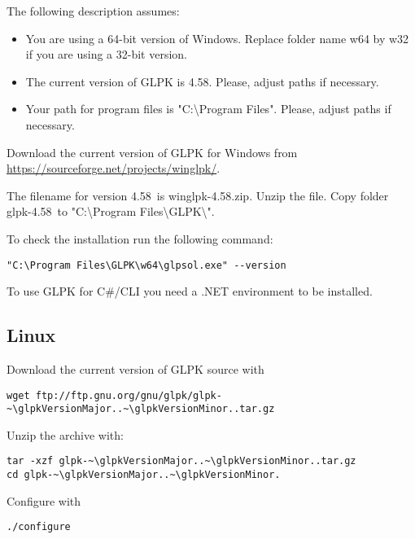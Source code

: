 \documentclass[a4paper,11pt]{report}
\newcommand{\glpkVersionMajor}{4}
\newcommand{\glpkVersionMinor}{58}
\begin{document}
The following description assumes:

\begin{itemize}
\item You are using a 64-bit version of Windows. Replace folder name w64 by w32
if you are using a 32-bit version.
\item The current version of GLPK is \glpkVersionMajor.\glpkVersionMinor.
Please, adjust paths if necessary.
\item Your path for program files is "C:\textbackslash Program Files". Please,
adjust paths if necessary.
\end{itemize}

Download the current version of GLPK for Windows from
\href{https://sourceforge.net/projects/winglpk/}{https://sourceforge.net/projects/winglpk/}.

The filename for version \glpkVersionMajor.\glpkVersionMinor\ is
winglpk-\glpkVersionMajor.\glpkVersionMinor.zip. Unzip the file. Copy folder
glpk-\glpkVersionMajor.\glpkVersionMinor\ to "C:\textbackslash Program
Files\textbackslash GLPK\textbackslash ".

To check the installation run the following command:

\begin{lstlisting}
"C:\Program Files\GLPK\w64\glpsol.exe" --version
\end{lstlisting}

To use GLPK for C\#/CLI you need a .NET environment to be installed.

\subsection{Linux}

Download the current version of GLPK source with

\begin{lstlisting}
wget ftp://ftp.gnu.org/gnu/glpk/glpk-~\glpkVersionMajor..~\glpkVersionMinor..tar.gz
\end{lstlisting}

Unzip the archive with:

\begin{lstlisting}
tar -xzf glpk-~\glpkVersionMajor..~\glpkVersionMinor..tar.gz
cd glpk-~\glpkVersionMajor..~\glpkVersionMinor.
\end{lstlisting}

Configure with

\begin{lstlisting}
./configure
\end{lstlisting}
\end{document}
